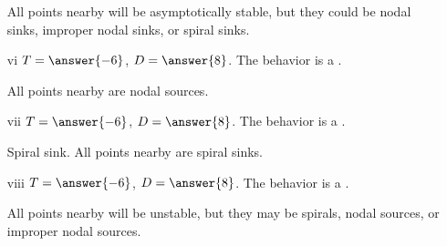 \documentclass{ximera}
\begin{document}
\begin{exercise}
\begin{itemize}
            \begin{feedback}[correct]
                All points nearby will be asymptotically stable, but they could be nodal sinks, improper nodal sinks, or spiral sinks.
            \end{feedback}
        \item[vi]  $T=\answer{-6}$, $D = \answer{8}$. 
            The behavior is a  .
            \begin{feedback}[correct]
                All points nearby are nodal sources.
            \end{feedback}
         \item[vii]  $T=\answer{-6}$, $D = \answer{8}$. 
             The behavior is a  .
            \begin{feedback}[correct]
                Spiral sink. All points nearby are spiral sinks.
            \end{feedback}
        \item[viii]  $T=\answer{-6}$, $D = \answer{8}$. 
            The behavior is a  .
            \begin{feedback}[correct]
                All points nearby will be unstable, but they may be spirals, nodal sources, or improper nodal sources.
            \end{feedback}
    \end{itemize}
\end{exercise}
\end{document}

